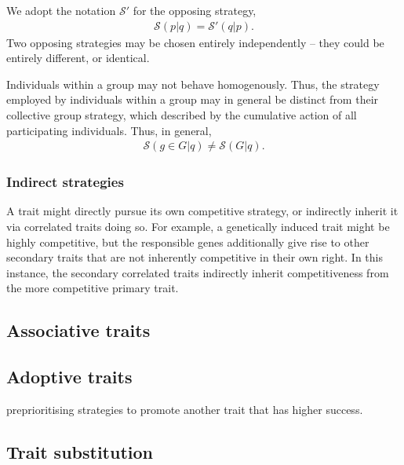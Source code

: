 \documentclass[aps,rmp,twocolumn,amsmath,amssymb,nofootinbib,superscriptaddress]{revtex4}
\begin{document}

We adopt the notation $\mathcal{S}'$ for the opposing strategy,
\begin{align}
	\mathcal{S}(p|q) = \mathcal{S}'(q|p).
\end{align}
Two opposing strategies may be chosen entirely independently -- they could be entirely different, or identical.

Individuals within a group may not behave homogenously. Thus, the strategy employed by individuals within a group may in general be distinct from their collective group strategy, which described by the cumulative action of all participating individuals. Thus, in general,
\begin{align}
	\mathcal{S}(g\in G|q)\neq \mathcal{S}(G|q).
\end{align}

\subsubsection{Indirect strategies}

A trait might directly pursue its own competitive strategy, or indirectly inherit it via correlated traits doing so. For example, a genetically induced trait might be highly competitive, but the responsible genes additionally give rise to other secondary traits that are not inherently competitive in their own right. In this instance, the secondary correlated traits indirectly inherit competitiveness from the more competitive primary trait.

\subsection{Associative traits}

\subsection{Adoptive traits}

preprioritising strategies to promote another trait that has higher success.

\subsection{Trait substitution}
\end{document}
